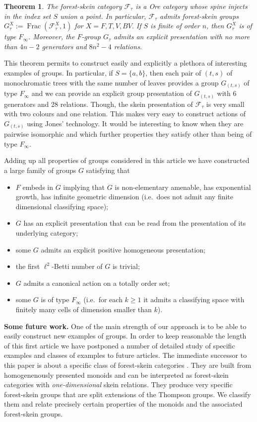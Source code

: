 \documentclass[a4paper, 12pt]{amsart}
\numberwithin{equation}{section}
\newtheorem{lettertheo}{Theorem}
\theoremstyle{definition}
\newcommand{\cF}{\mathcal F}
\DeclareMathOperator{\Frac}{Frac}
\begin{document}
\begin{lettertheo}
The forest-skein category $\cF_\tau$ is a Ore category whose spine injects in the index set $S$ union a point.
In particular, $\cF_\tau$ admits forest-skein groups $G^X_\tau:=\Frac(\cF^X_\tau,1)$ for $X=F,T,V,BV.$
If $S$ is finite of order $n$, then $G_\tau^X$ is of type $F_\infty$.
Moreover, the $F$-group $G_\tau$ admits an explicit presentation with no more than $4n-2$ generators and $8n^2-4$ relations. 
\end{lettertheo}

This theorem permits to construct easily and explicitly a plethora of interesting examples of groups.
In particular, if $S=\{a,b\}$, then each pair of $(t,s)$ of monochromatic trees with the same number of leaves provides a group $G_{(t,s)}$ of type $F_\infty$ and we can provide an explicit group presentation of $G_{(t,s)}$ with 6 generators and 28 relations.
Though, the skein presentation of $\cF_\tau$ is very small with two colours and one relation. This makes very easy to construct actions of $G_{(t,s)}$ using Jones' technology.
It would be interesting to know when they are pairwise isomorphic and which further properties they satisfy other than being of type $F_\infty$.

Adding up all properties of groups considered in this article we have constructed a large family of groups $G$ satisfying that
\begin{itemize}
\item $F$ embeds in $G$ implying that $G$ is non-elementary amenable, has exponential growth, has infinite geometric dimension (i.e.~does not admit any finite dimensional classifying space);
\item $G$ has an explicit presentation that can be read from the presentation of its underlying category;
\item some $G$ admits an explicit positive homogeneous presentation;
\item the first $\ell^2$-Betti number of $G$ is trivial;
\item $G$ admits a canonical action on a totally order set;
\item some $G$ is of type $F_\infty$ (i.e.~for each $k\geq 1$ it admits a classifying space with finitely many cells of dimension smaller than $k$).
\end{itemize}

{\bf Some future work.}
One of the main strength of our approach is to be able to easily construct new examples of groups.
In order to keep reasonable the length of this first article we have postponed a number of detailed study of specific examples and classes of examples to future articles.
The immediate successor to this paper is about a specific class of forest-skein categories \cite{Brothier22-HPM}.
They are built from homogenenously presented monoids and can be interpreted as forest-skein categories with {\it one-dimensional} skein relations.
They produce very specific forest-skein groups that are split extensions of the Thompson groups. 
We classify them and relate precisely certain properties of the monoids and the associated forest-skein groups. 
\end{document}
